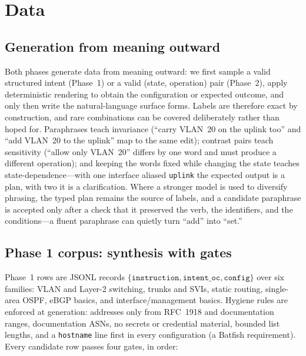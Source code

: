 \documentclass[conference]{IEEEtran}
\begin{document}
\section{Data}
\label{sec:data}

\subsection{Generation from meaning outward}

Both phases generate data from meaning outward: we first sample a valid structured intent (Phase~1) or a valid (state, operation) pair (Phase~2), apply deterministic rendering to obtain the configuration or expected outcome, and only then write the natural-language surface forms. Labels are therefore exact by construction, and rare combinations can be covered deliberately rather than hoped for. Paraphrases teach invariance (``carry VLAN~20 on the uplink too'' and ``add VLAN~20 to the uplink'' map to the same edit); contrast pairs teach sensitivity (``allow only VLAN~20'' differs by one word and must produce a different operation); and keeping the words fixed while changing the state teaches state-dependence---with one interface aliased \texttt{uplink} the expected output is a plan, with two it is a clarification. Where a stronger model is used to diversify phrasing, the typed plan remains the source of labels, and a candidate paraphrase is accepted only after a check that it preserved the verb, the identifiers, and the conditions---a fluent paraphrase can quietly turn ``add'' into ``set.''

\subsection{Phase 1 corpus: synthesis with gates}

Phase~1 rows are JSONL records $\{\texttt{instruction}, \texttt{intent\_oc}, \texttt{config}\}$ over six families: VLAN and Layer-2 switching, trunks and SVIs, static routing, single-area OSPF, eBGP basics, and interface/management basics. Hygiene rules are enforced at generation: addresses only from RFC~1918 and documentation ranges, documentation ASNs, no secrets or credential material, bounded list lengths, and a \texttt{hostname} line first in every configuration (a Batfish requirement). Every candidate row passes four gates, in order:
\end{document}
